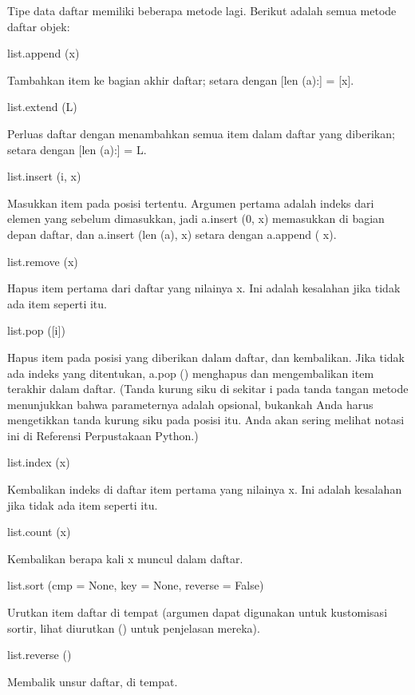 \vspace{12pt}
\vspace{12pt}
\noindent 
Tipe data daftar memiliki beberapa metode lagi. Berikut adalah semua metode daftar objek: \par
\vspace{12pt}
\noindent 
list.append (x) \par
\noindent 
Tambahkan item ke bagian akhir daftar; setara dengan [len (a):] = [x]. \par
\vspace{12pt}
\noindent 
list.extend (L) \par
\noindent 
Perluas daftar dengan menambahkan semua item dalam daftar yang diberikan; setara dengan [len (a):] = L. \par
\vspace{12pt}
\noindent 
list.insert (i, x) \par
\noindent 
Masukkan item pada posisi tertentu. Argumen pertama adalah indeks dari elemen yang sebelum dimasukkan, jadi a.insert (0, x) memasukkan di bagian depan daftar, dan a.insert (len (a), x) setara dengan a.append ( x). \par
\vspace{12pt}
\noindent 
list.remove (x) \par
\noindent 
Hapus item pertama dari daftar yang nilainya x. Ini adalah kesalahan jika tidak ada item seperti itu. \par
\vspace{12pt}
\noindent 
list.pop ([i]) \par
\noindent 
Hapus item pada posisi yang diberikan dalam daftar, dan kembalikan. Jika tidak ada indeks yang ditentukan, a.pop () menghapus dan mengembalikan item terakhir dalam daftar. (Tanda kurung siku di sekitar i pada tanda tangan metode menunjukkan bahwa parameternya adalah opsional, bukankah Anda harus mengetikkan tanda kurung siku pada posisi itu. Anda akan sering melihat notasi ini di Referensi Perpustakaan Python.) \par
\vspace{12pt}
\noindent 
list.index (x) \par
\noindent 
Kembalikan indeks di daftar item pertama yang nilainya x. Ini adalah kesalahan jika tidak ada item seperti itu. \par
\vspace{12pt}
\noindent 
list.count (x) \par
\noindent 
Kembalikan berapa kali x muncul dalam daftar. \par
\vspace{12pt}
\noindent 
list.sort (cmp = None, key = None, reverse = False) \par
\noindent 
Urutkan item daftar di tempat (argumen dapat digunakan untuk kustomisasi sortir, lihat diurutkan () untuk penjelasan mereka). \par
\vspace{12pt}
\noindent 
list.reverse () \par
\noindent 
Membalik unsur daftar, di tempat. \par

